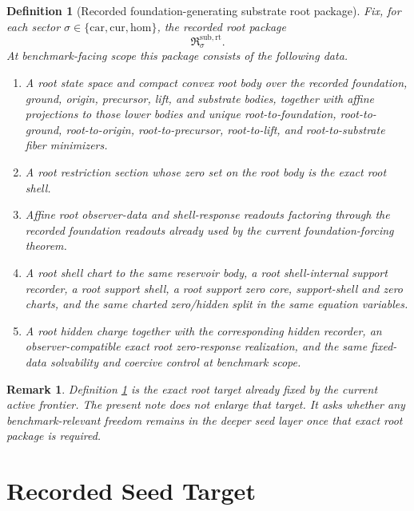 \documentclass[11pt]{article}
\newcommand{\Car}{\mathrm{car}}
\newcommand{\Cur}{\mathrm{cur}}
\newcommand{\Hom}{\mathrm{hom}}
\newcommand{\RootPackage}{\mathfrak R^{\mathrm{sub,rt}}}
\newtheorem{definition}{Definition}
\newtheorem{remark}{Remark}
\begin{document}
\begin{definition}[Recorded foundation-generating substrate root package]
\label{def:root}
Fix, for each sector \(\sigma\in\{\Car,\Cur,\Hom\}\), the recorded root package
\[
\RootPackage_{\sigma}.
\]
At benchmark-facing scope this package consists of the following data.
\begin{enumerate}
    \item A root state space and compact convex root body over the recorded foundation, ground, origin, precursor, lift, and substrate bodies, together with affine projections to those lower bodies and unique root-to-foundation, root-to-ground, root-to-origin, root-to-precursor, root-to-lift, and root-to-substrate fiber minimizers.
    \item A root restriction section whose zero set on the root body is the exact root shell.
    \item Affine root observer-data and shell-response readouts factoring through the recorded foundation readouts already used by the current foundation-forcing theorem.
    \item A root shell chart to the same reservoir body, a root shell-internal support recorder, a root support shell, a root support zero core, support-shell and zero charts, and the same charted zero/hidden split in the same equation variables.
    \item A root hidden charge together with the corresponding hidden recorder, an observer-compatible exact root zero-response realization, and the same fixed-data solvability and coercive control at benchmark scope.
\end{enumerate}
\end{definition}

\begin{remark}
Definition \ref{def:root} is the exact root target already fixed by the current active frontier. The present note does not enlarge that target. It asks whether any benchmark-relevant freedom remains in the deeper seed layer once that exact root package is required.
\end{remark}

\section{Recorded Seed Target}
\end{document}
